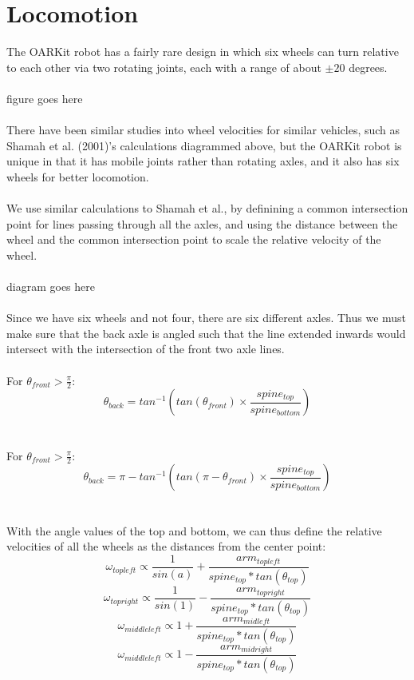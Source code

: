 \documentclass[]{article}
\begin{document}
\section{Locomotion}
The OARKit robot has a fairly rare design in which six wheels can turn relative to each other via two rotating joints, each with a range of about $\pm20$ degrees.
\\
\\
figure goes here
\\
\\
There have been similar studies into wheel velocities for similar vehicles, such as Shamah et al. (2001)'s calculations diagrammed above, but the OARKit robot is unique in that it has mobile joints rather than rotating axles, and it also has six wheels for better locomotion.
\\
\\
We use similar calculations to Shamah et al., by definining a common intersection point for lines passing through all the axles, and using the distance between the wheel and the common intersection point to scale the relative velocity of the wheel.
\\
\\
diagram goes here
\\
\\
Since we have six wheels and not four, there are six different axles. Thus we must make sure that the back axle is angled such that the line extended inwards would intersect with the intersection of the front two axle lines.
\\
\\
For $\theta_{front} > \frac{\pi}{2}$:
\[ \theta_{back} = tan^{-1}(tan(\theta_{front}) \times \frac{spine_{top}}{spine_{bottom}}) \]
\\
\\
For $\theta_{front} > \frac{\pi}{2}$:
\[ \theta_{back} = \pi - tan^{-1}(tan(\pi - \theta_{front}) \times \frac{spine_{top}}{spine_{bottom}}) \]
\\
\\
With the angle values of the top and bottom, we can thus define the relative velocities of all the wheels as the distances from the center point:
\\
\[ \omega_{topleft} \propto \frac{1}{sin(a)} + \frac{arm_{topleft}}{spine_{top} * tan(\theta_{top})} \]
\[ \omega_{topright} \propto \frac{1}{sin(1)} - \frac{arm_{topright}}{spine_{top} * tan(\theta_{top})} \]
\[ \omega_{middleleft} \propto 1 + \frac{arm_{midleft}}{spine_{top} * tan(\theta_{top})} \]
\[ \omega_{middleleft} \propto 1 - \frac{arm_{midright}}{spine_{top} * tan(\theta_{top})} \]
\end{document}
